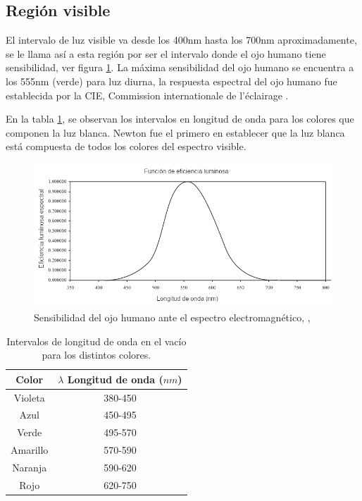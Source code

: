 \subsection{Región visible}
El intervalo de luz visible va desde los 400nm hasta los 700nm aproximadamente, se le llama así a esta región por ser el intervalo donde el ojo humano tiene sensibilidad, ver figura \ref{fig:ojohumano}. La máxima sensibilidad del ojo humano se encuentra a los 555nm (verde) para luz diurna, la respuesta espectral del ojo humano fue establecida por la CIE, Commission internationale de l'éclairage \cite{CIE1924}.

En la tabla \ref{tabla:ojo},  se observan los intervalos en longitud de onda para los colores que componen la luz blanca.
Newton fue el primero en establecer que la luz blanca está compuesta de todos los colores del espectro visible.
\begin{figure}
	\centering
	\includegraphics[width=0.8\linewidth]{Imagenes/SpectralL}
	\caption{Sensibilidad del ojo humano ante el espectro electromagnético, \cite{CRC2016}, \cite{inproceedings}}
	\label{fig:ojohumano}
\end{figure}

\begin{table}
\centering

\caption{Intervalos de longitud de onda en el vacío para los distintos colores. \cite{Bruno2005}}
\begin{tabular}{|c|c|}
	\hline 
	Color & $\lambda$ Longitud de onda ($nm$) \\ 
	\hline 
	Violeta & 380-450 \\ 
	\hline 
	Azul & 450-495  \\ 
	\hline 
	Verde & 495-570  \\ 
	\hline 
	Amarillo & 570-590 \\ 
	\hline 
	Naranja & 590-620 \\ 
	\hline 
	Rojo & 620-750 \\ 
	\hline 
\end{tabular} 
\label{tabla:ojo}		
\end{table}


